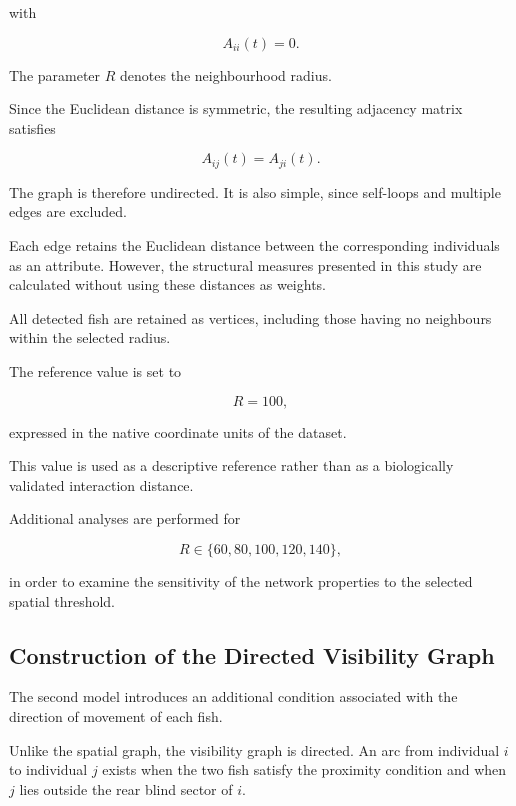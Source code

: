\documentclass[10pt,a4paper]{article}
\begin{document}
with

\begin{equation}
A_{ii}(t)=0.
\end{equation}

The parameter $R$ denotes the neighbourhood radius.

Since the Euclidean distance is symmetric, the resulting
adjacency matrix satisfies

\begin{equation}
A_{ij}(t)=A_{ji}(t).
\end{equation}

The graph is therefore undirected. It is also simple,
since self-loops and multiple edges are excluded.

Each edge retains the Euclidean distance between the
corresponding individuals as an attribute. However,
the structural measures presented in this study are
calculated without using these distances as weights.

All detected fish are retained as vertices, including
those having no neighbours within the selected radius.

The reference value is set to

\begin{equation}
R=100,
\end{equation}

expressed in the native coordinate units of the dataset.

This value is used as a descriptive reference rather
than as a biologically validated interaction distance.

Additional analyses are performed for

\begin{equation}
R\in\{60,80,100,120,140\},
\end{equation}

in order to examine the sensitivity of the network
properties to the selected spatial threshold.

\subsection{Construction of the Directed Visibility Graph}

The second model introduces an additional condition
associated with the direction of movement of each fish.

Unlike the spatial graph, the visibility graph is
directed. An arc from individual $i$ to individual $j$
exists when the two fish satisfy the proximity condition
and when $j$ lies outside the rear blind sector of $i$.
\end{document}
